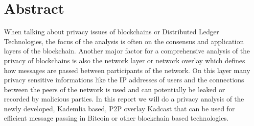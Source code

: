\section{Abstract}
When talking about privacy issues of blockchains or Distributed Ledger Technologies, the
focus of the analysis is often on the consensus and application layers of the blockchain.
Another major factor for a comprehensive analysis of the privacy of blockchains is also
the network layer or network overlay which defines how messages are passed between participants of the network.
On this layer many privacy sensitive informations like the IP addresses of users and the connections between the peers
of the network is used and can potentially be leaked or recorded by malicious parties.
In this report we will do a privacy analysis of the newly developed, Kademlia based,
P2P overlay Kadcast that can be used for efficient message passing in Bitcoin or other blockchain based technologies.